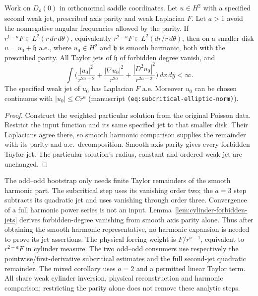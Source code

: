\begin{lemma}
\label{lem:cylinder-inverse}
\leanok
Work on $D_\rho(0)$ in orthonormal saddle coordinates. Let $u\in H^2$
with a specified second weak jet, prescribed axis parity and weak Laplacian
$F$. Let $a>1$
avoid the nonnegative angular frequencies allowed by the parity. If
$r^{1-a}F\in L^2(r\,dr\,d\theta)$, equivalently
$r^{2-a}F\in L^2(dr/r\,d\theta)$, then on a smaller disk
$u=u_0+\mathfrak h$ a.e., where $u_0\in H^2$ and
$\mathfrak h$ is smooth harmonic, both with the prescribed parity.
All Taylor jets of $\mathfrak h$ of forbidden degree vanish, and
\[
  \int\Big(\frac{|u_0|^2}{r^{2a+2}}+\frac{|\nabla u_0|^2}{r^{2a}}
           +\frac{|D^2u_0|^2}{r^{2a-2}}\Big)\,dx\,dy<\infty .
\]
The specified weak jet of $u_0$ has Laplacian $F$ a.e.
Moreover $u_0$ can be chosen continuous with $|u_0|\le Cr^a$
(manuscript \texttt{(eq:subcritical-elliptic-norm)}).
\end{lemma}

\begin{proof}
\leanok
Construct the weighted particular solution from the original Poisson data.
Restrict the input function and its same specified jet to that smaller disk.
Their Laplacians agree there, so smooth harmonic comparison supplies the
remainder with its parity and a.e.\ decomposition.
Smooth axis parity gives every forbidden Taylor jet.
The particular solution's radius, constant and ordered weak jet are unchanged.
\end{proof}

\begin{remark}
The odd--odd bootstrap only needs finite Taylor remainders of the smooth harmonic
part. The subcritical step uses its vanishing order two; the $a=3$ step
subtracts its quadratic jet and uses vanishing through order three.
Convergence of a full harmonic power series is not an input.
Lemma~\ref{lem:cylinder-forbidden-jets} derives forbidden-degree vanishing
from smooth axis parity alone. Thus after obtaining the smooth harmonic
representative, no harmonic expansion is needed to prove its jet assertions.
The physical forcing weight is $F/r^{a-1}$, equivalent to $r^{2-a}F$ in
cylinder measure.
The two odd--odd consumers use respectively the pointwise/first-derivative
subcritical estimates and the full second-jet quadratic remainder.
The mixed corollary uses $a=2$ and a permitted linear Taylor term.
All share weak cylinder inversion, physical reconstruction and harmonic
comparison; restricting the parity alone does not remove these analytic steps.
\end{remark}

